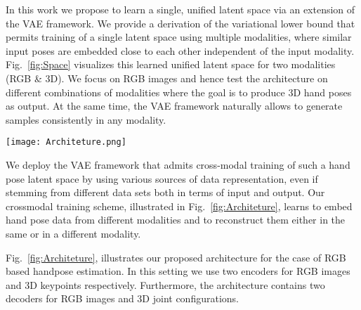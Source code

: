 \documentclass[10pt,twocolumn,letterpaper]{article}
\begin{document}
In this work we propose to learn a single, unified latent
space via an extension of the VAE framework. We provide a
derivation of the variational lower bound that permits training
of a single latent space using multiple modalities, where
similar input poses are embedded close to each other independent
of the input modality. Fig.~\ref{fig:Space} visualizes this learned
unified latent space for two modalities (RGB \& 3D). We
focus on RGB images and hence test the architecture on
different combinations of modalities where the goal is to
produce 3D hand poses as output. At the same time, the
VAE framework naturally allows to generate samples consistently
in any modality.\par

\begin{figure*}
\begin{center}
   \texttt{[image: Architeture.png]}
\end{center}
   \caption{\textbf{Schematic overview of our architecture.}Left: a cross-modal latent space z is learned by training pairs of encoder
and decoder q, p networks across multiple modalities (e.g., RGB images to 3D hand poses). Auxilliary encoder-decoder pairs
help in regularizing the latent space. Right: The approach allows to embed input samples of one set of modalities (here:
RGB, 3D) and to produce consistent and plausible posterior estimates in several different modalities (RGB, 2D and 3D).}
\label{fig:Architeture}
\end{figure*}

We deploy the VAE framework that admits cross-modal
training of such a hand pose latent space by using various
sources of data representation, even if stemming from different
data sets both in terms of input and output. Our crossmodal
training scheme, illustrated in Fig.~\ref{fig:Architeture}, learns to embed
hand pose data from different modalities and to reconstruct
them either in the same or in a different modality.\par
Fig.~\ref{fig:Architeture}, illustrates our proposed architecture for the case
of RGB based handpose estimation. In this setting we use
two encoders for RGB images and 3D keypoints respectively.
Furthermore, the architecture contains two decoders
for RGB images and 3D joint configurations.\par

{\small


}
\end{document}
